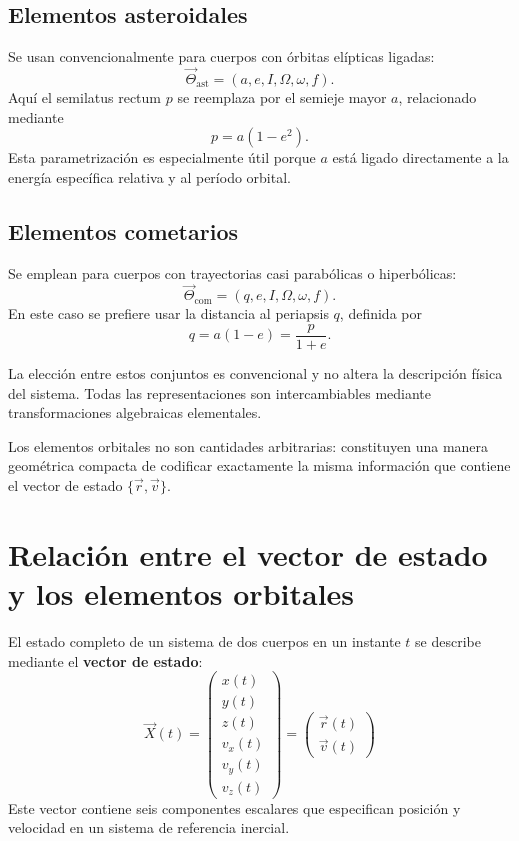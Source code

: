 \subsection{Elementos asteroidales}
Se usan convencionalmente para cuerpos con órbitas elípticas ligadas:
\[
\vec{\Theta}_{\mathrm{ast}} = (a, e, I, \Omega, \omega, f).
\]
Aquí el semilatus rectum \(p\) se reemplaza por el semieje mayor \(a\), relacionado mediante
\[
 p = a(1-e^2).
\]
Esta parametrización es especialmente útil porque \(a\) está ligado directamente a la energía específica relativa y al período orbital.

\subsection{Elementos cometarios}
Se emplean para cuerpos con trayectorias casi parabólicas o hiperbólicas:
\[
\vec{\Theta}_{\mathrm{com}} = (q, e, I, \Omega, \omega, f).
\]
En este caso se prefiere usar la distancia al periapsis \(q\), definida por
\[
 q = a(1-e) = \frac{p}{1+e}.
\]

La elección entre estos conjuntos es convencional y no altera la descripción física del sistema. Todas las representaciones son intercambiables mediante transformaciones algebraicas elementales.

\begin{importante}
Los elementos orbitales no son cantidades arbitrarias: constituyen una manera geométrica compacta de codificar exactamente la misma información que contiene el vector de estado \(\{\vec{r},\vec{v}\}\).
\end{importante}

\section{Relación entre el vector de estado y los elementos orbitales}
El estado completo de un sistema de dos cuerpos en un instante \(t\) se describe mediante el \textbf{vector de estado}:
\[
\vec{X}(t) =
\begin{pmatrix}
 x(t) \\
 y(t) \\
 z(t) \\
 v_x(t) \\
 v_y(t) \\
 v_z(t)
\end{pmatrix}
=
\begin{pmatrix}
 \vec{r}(t) \\
 \vec{v}(t)
\end{pmatrix}
\]
Este vector contiene seis componentes escalares que especifican posición y velocidad en un sistema de referencia inercial.

